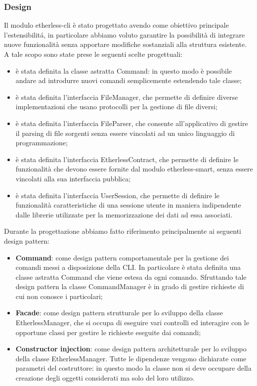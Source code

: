 \subsubsection{Design}
Il modulo etherless-cli è stato progettato avendo come obiettivo principale l'estensibilitá, in particolare abbiamo voluto garantire la possibilità di integrare nuove funzionalità senza apportare modifiche sostanziali alla struttura esistente. A tale scopo sono state prese le seguenti scelte progettuali:
\begin{itemize}
	\item è stata definita la classe astratta Command: in questo modo è possibile andare ad introdurre nuovi comandi semplicemente estendendo tale classe;
	\item è stata definita l'interfaccia FileManager, che permette di definire diverse implementazioni che usano protocolli per la gestione di file diversi;
	\item è stata definita l'interfaccia FileParser, che consente all'applicativo di gestire il parsing di file sorgenti senza essere vincolati ad un unico linguaggio di programmazione;
	\item è stata definita l'interfaccia EtherlessContract, che permette di definire le funzionalità che devono essere fornite dal modulo etherless-smart, senza essere vincolati alla sua interfaccia pubblica;
	\item è stata definita l'interfaccia UserSession, che permette di definire le funzionalità caratteristiche di una sessione utente in maniera indipendente dalle librerie utilizzate per la memorizzazione dei dati ad essa associati.
\end{itemize}

Durante la progettazione abbiamo fatto riferimento principalmente ai seguenti design pattern:
\begin{itemize}
	\item \textbf{Command}: come design pattern comportamentale per la gestione dei comandi messi a disposizione della CLI. In particolare è stata definita una classe astratta Command che viene estesa da ogni comando. Sfruttando tale design pattern la classe CommandManager è in grado di gestire richieste di cui non conosce i particolari;

	\item \textbf{Facade}: come design pattern strutturale per lo sviluppo della classe EtherlessManager, che si occupa di eseguire vari controlli ed interagire con le opportune classi per gestire le richieste eseguite dai comandi;

	\item \textbf{Constructor injection}: come design pattern architetturale per lo sviluppo della classe EtherlessManager. Tutte le dipendenze vengono dichiarate come parametri del costruttore: in questo modo la classe non si deve occupare della creazione degli oggetti considerati ma solo del loro utilizzo.
\end{itemize}


